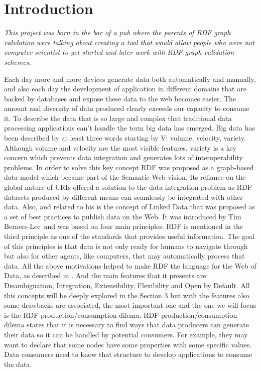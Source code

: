 \setchapterpreamble[u]{\margintoc}
\chapter{Introduction}

\textit{This project was born in the bar of a pub where the parents of RDF graph validation were talking about creating a tool that would allow people who were not computer-scientist to get started and later work with RDF graph validation schemes.}

Each day more and more devices generate data both automatically and manually, and also each day the development of application in different domains that are backed by databases and expose these data to the web becomes easier. The amount and diversity of data produced clearly exceeds our capacity to consume it.
To describe the data that is so large and complex that traditional data processing applications can’t handle the term big data has emerged. Big data has been described by at least three words starting by V: volume, velocity, variety. Although volume and velocity are the most visible features, variety is a key concern which prevents data integration and generates lots of interoperability problems.
In order to solve this key concept RDF was proposed as a graph-based data model which became part of the Semantic Web vision. Its reliance on the global nature of URIs offered a solution to the data integration problem as RDF datasets produced by different means can seamlessly be integrated with other data.
Also, and related to his is the concept of Linked Data \cite{heath2011linked} that was proposed as a set of best practices to publish data on the Web. It was introduced by Tim Berners-Lee and was based on four main principles. RDF is mentioned in the third principle as one of the standards that provides useful information. The goal of this principles is that data is not only ready for humans to navigate through but also for other agents, like computers, that may automatically process that data.
All the above motivations helped to make RDF the language for the Web of Data, as described in \cite{gayo2017validating}. And the main features that it presents are: Disambiguation, Integration, Extensibility, Flexibility and Open by Default. All this concepts will be deeply explored in the Section 3 but with the features also some drawbacks are associated, the most important one and the one we will focus is the RDF production/consumption dilema.
RDF production/consumption dilema states that it is necessary to find ways that data producers can generate their data so it can be handled by potential consumers. For example, they may want to declare that some nodes have some properties with some specific values. Data consumers need to know that structure to develop applications to consume the data.
